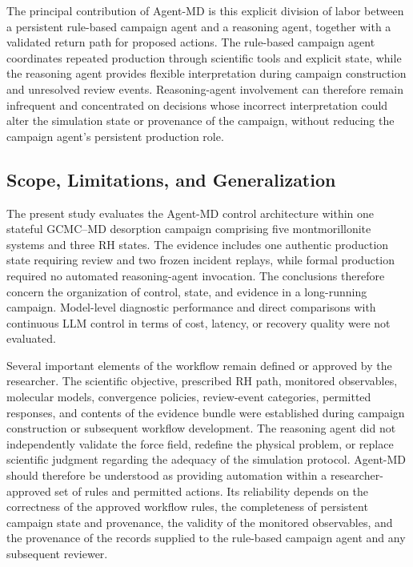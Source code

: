 The principal contribution of Agent-MD is this explicit division of labor between a persistent rule-based campaign agent and a reasoning agent, together with a validated return path for proposed actions. The rule-based campaign agent coordinates repeated production through scientific tools and explicit state, while the reasoning agent provides flexible interpretation during campaign construction and unresolved review events. Reasoning-agent involvement can therefore remain infrequent and concentrated on decisions whose incorrect interpretation could alter the simulation state or provenance of the campaign, without reducing the campaign agent's persistent production role.

\subsection{Scope, Limitations, and Generalization}

The present study evaluates the Agent-MD control architecture within one stateful GCMC--MD desorption campaign comprising five montmorillonite systems and three RH states. The evidence includes one authentic production state requiring review and two frozen incident replays, while formal production required no automated reasoning-agent invocation. The conclusions therefore concern the organization of control, state, and evidence in a long-running campaign. Model-level diagnostic performance and direct comparisons with continuous LLM control in terms of cost, latency, or recovery quality were not evaluated.

Several important elements of the workflow remain defined or approved by the researcher. The scientific objective, prescribed RH path, monitored observables, molecular models, convergence policies, review-event categories, permitted responses, and contents of the evidence bundle were established during campaign construction or subsequent workflow development. The reasoning agent did not independently validate the force field, redefine the physical problem, or replace scientific judgment regarding the adequacy of the simulation protocol. Agent-MD should therefore be understood as providing automation within a researcher-approved set of rules and permitted actions. Its reliability depends on the correctness of the approved workflow rules, the completeness of persistent campaign state and provenance, the validity of the monitored observables, and the provenance of the records supplied to the rule-based campaign agent and any subsequent reviewer.

